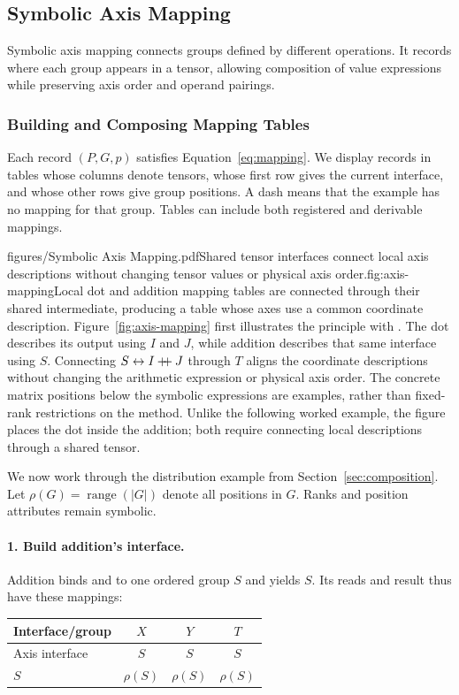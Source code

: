 \FloatBarrier
\subsection{Symbolic Axis Mapping}
\label{sec:axis-mapping}
Symbolic axis mapping connects groups defined by different operations. It
records where each group appears in a tensor, allowing composition of value
expressions while preserving axis order and operand pairings.

\FloatBarrier
\subsubsection{Building and Composing Mapping Tables}
\label{sec:mapping-tables}
Each record $(P,G,p)$ satisfies Equation~\eqref{eq:mapping}. We display records
in tables whose columns denote tensors, whose first row gives the current
interface, and whose other rows give group positions. A dash means that the
example has no mapping for that group. Tables can include both registered
and derivable mappings.

\begin{figuretext}{figures/Symbolic Axis Mapping.pdf}{Shared tensor interfaces connect local axis descriptions without changing tensor values or physical axis order.}{fig:axis-mapping}{Local dot and addition mapping tables are connected through their shared
intermediate, producing a table whose axes use a common coordinate description.}
Figure~\ref{fig:axis-mapping} first illustrates the principle with
 . The dot describes its output using $I$ and
$J$, while addition describes that same interface using $S$. Connecting
$S\leftrightarrow I\mathbin{+\!\!+} J$ through $T$ aligns the coordinate descriptions
without changing the arithmetic expression or physical axis order. The
concrete matrix positions below the symbolic expressions are examples,
rather than fixed-rank restrictions on the method. Unlike the following
worked example, the figure places the dot inside the addition; both require
connecting local descriptions through a shared tensor.


We now work through the distribution example
  from
Section~\ref{sec:composition}. Let $\rho(G)=\operatorname{range}(|G|)$ denote
all positions in $G$. Ranks and position attributes remain symbolic.
\paragraph{1. Build addition's interface.}
Addition binds  and  to one ordered group $S$ and yields $S$.
Its reads and result thus have these mappings:
\begin{center}
\begin{tabular}{@{}lccc@{}}\toprule
Interface/group & $X$ & $Y$ & $T$\\\midrule
Axis interface & $S$ & $S$ & $S$\\
$S$ & $\rho(S)$ & $\rho(S)$ & $\rho(S)$\\\bottomrule
\end{tabular}
\end{center}

\end{figuretext}

